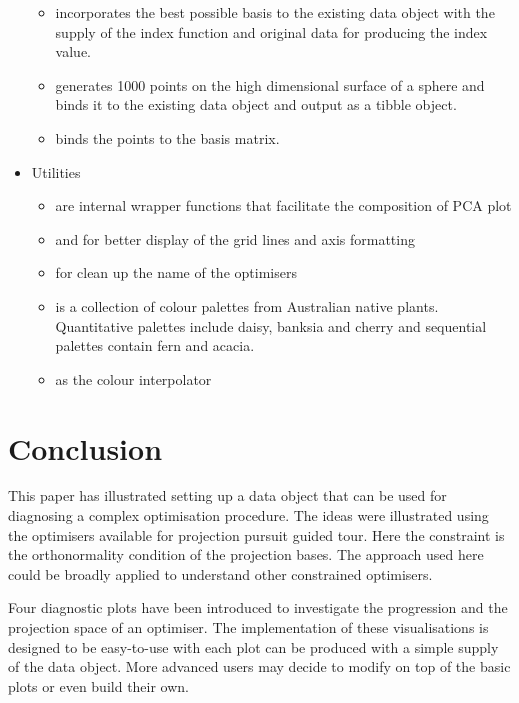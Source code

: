 \begin{itemize}
  \begin{itemize}
  \tightlist
  \item
     incorporates the best possible basis to
    the existing data object with the supply of the index function and
    original data for producing the index value.
  \item
     generates 1000 points on the high dimensional
    surface of a sphere and binds it to the existing data object and
    output as a tibble object.
  \item
     binds the points to the basis matrix.
  \end{itemize}
\item
  Utilities

  \begin{itemize}
  \tightlist
  \item
     are internal wrapper functions that facilitate the
    composition of PCA plot
  \item
     and  for better display
    of the grid lines and axis formatting
  \item
     for clean up the name of the optimisers
  \item
     is a collection of colour palettes from
    Australian native plants. Quantitative palettes include daisy,
    banksia and cherry and sequential palettes contain fern and acacia.
  \item
     as the colour interpolator
  \end{itemize}
\end{itemize}

\hypertarget{conclusion}{%
\section{Conclusion}\label{conclusion}}

This paper has illustrated setting up a data object that can be used for
diagnosing a complex optimisation procedure. The ideas were illustrated
using the optimisers available for projection pursuit guided tour. Here
the constraint is the orthonormality condition of the projection bases.
The approach used here could be broadly applied to understand other
constrained optimisers.

Four diagnostic plots have been introduced to investigate the
progression and the projection space of an optimiser. The implementation
of these visualisations is designed to be easy-to-use with each plot can
be produced with a simple supply of the data object. More advanced users
may decide to modify on top of the basic plots or even build their own.

